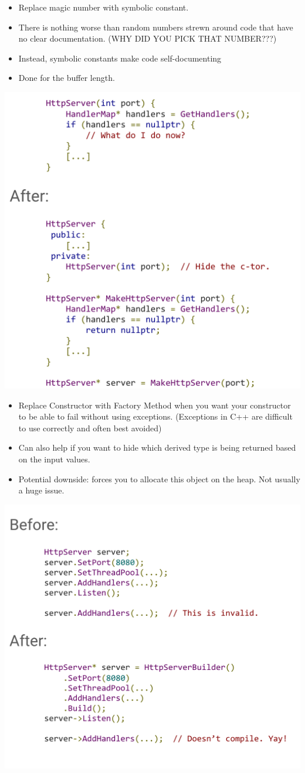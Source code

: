 \documentclass{article}
\begin{document}
\begin{center}
    \begin{itemize}
        \item Replace magic number with symbolic constant.
        \item There is nothing worse than random numbers strewn around code that have no clear documentation. (WHY DID YOU PICK THAT NUMBER???)
        \item Instead, symbolic constants make code self-documenting
        \item Done for the buffer length.
    \end{itemize}
\end{center}

\includegraphics*[width=0.6\linewidth]{refactorEx4.png}

\begin{center}
    \begin{itemize}
        \item Replace Constructor with Factory Method when you want your constructor to be able to fail without using exceptions. (Exceptions in C++ are difficult to use correctly and often best avoided)
        \item Can also help if you want to hide which derived type is being returned based on the input values.
        \item Potential downside: forces you to allocate this object on the heap. Not usually a huge issue.
    \end{itemize}
\end{center}

\includegraphics*[width=0.6\linewidth]{refactorEx5.png}
\end{document}
